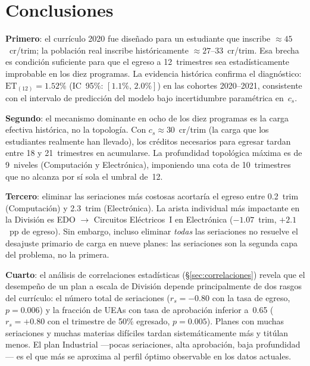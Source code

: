 \documentclass[11pt,letterpaper]{article}
\newcommand{\ET}[1]{\mathrm{ET}_{(#1)}}
\begin{document}
\section{Conclusiones}
\label{sec:conclusiones}

\textbf{Primero}: el currículo 2020 fue diseñado para un estudiante que
inscribe $\approx 45$~cr/trim; la población real inscribe históricamente
$\approx 27$--$33$~cr/trim.
Esa brecha es condición suficiente para que el egreso a 12~trimestres
sea estadísticamente improbable en los diez programas.
La evidencia histórica confirma el diagnóstico: $\ET{12}=1.52\%$
(IC~95\%: $[1.1\%,\,2.0\%]$) en las cohortes 2020--2021,
consistente con el intervalo de predicción del modelo bajo incertidumbre
paramétrica en~$c_s$.

\textbf{Segundo}: el mecanismo dominante en ocho de los diez programas es la
carga efectiva histórica, no la topología.
Con $c_s\approx 30$~cr/trim (la carga que los estudiantes realmente han
llevado), los créditos necesarios para egresar tardan entre 18 y 21~trimestres
en acumularse.
La profundidad topológica máxima es de 9~niveles (Computación y Electrónica),
imponiendo una cota de 10~trimestres que no alcanza por sí sola el umbral de~12.

\textbf{Tercero}: eliminar las seriaciones más costosas acortaría el egreso
entre 0.2~trim (Computación) y 2.3~trim (Electrónica).
La arista individual más impactante en la División es EDO $\to$ Circuitos
Eléctricos~I en Electrónica ($-1.07$~trim, $+2.1$~pp de egreso).
Sin embargo, incluso eliminar \emph{todas} las seriaciones no resuelve el
desajuste primario de carga en nueve planes: las seriaciones son la segunda
capa del problema, no la primera.

\textbf{Cuarto}: el análisis de correlaciones estadísticas (\S\ref{sec:correlaciones})
revela que el desempeño de un plan a escala de División depende principalmente de
dos rasgos del currículo: el número total de seriaciones
($r_s=-0.80$ con la tasa de egreso, $p=0.006$) y la fracción de UEAs con tasa
de aprobación inferior a~0.65
($r_s=+0.80$ con el trimestre de 50\% egresado, $p=0.005$).
Planes con muchas seriaciones y muchas materias difíciles tardan sistemáticamente
más y titúlan menos.
El plan Industrial ---pocas seriaciones, alta aprobación, baja profundidad--- es el
que más se aproxima al perfil óptimo observable en los datos actuales.
\end{document}
